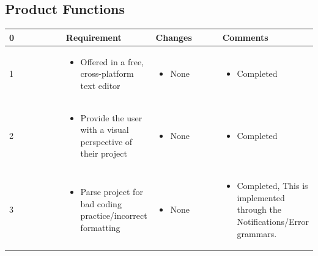 \documentclass[letterpaper,10pt,titlepage,draftclsnofoot,onecolumn,onesided] {IEEEtran}
\begin{document}
\subsection{Product Functions}
\small{
\begin{center}
	\begin{singlespace}
		\begin{tabular}{ |  p{0.25\linewidth}  |  p{0.25\linewidth}  | p{0.25\linewidth} | p{0.25\linewidth} |}
		\hline
		0 & Requirement & Changes & Comments \\ \hline
		
			1
		& 
			\begin{itemize}
				\item Offered in a free, cross-platform text editor
			\end{itemize}
		& 
			\begin{itemize}
				\item None
			\end{itemize}
		&
			\begin{itemize}
				\item Completed
			\end{itemize} 
		
        \\ \hline

			2
		& 
			\begin{itemize}
				\item Provide the user with a visual perspective of their project
			\end{itemize}
		& 
			\begin{itemize}
				\item None
			\end{itemize}
		&
			\begin{itemize}
				\item Completed
			\end{itemize} 
		
        \\ \hline

            3
		& 
			\begin{itemize}
				\item Parse project for bad coding practice/incorrect formatting
			\end{itemize}
		& 
			\begin{itemize}
				\item None
			\end{itemize}
		&
			\begin{itemize}
				\item Completed, This is implemented through the Notifications/Error grammars.
			\end{itemize} 
		

\end{tabular}
\end{singlespace}
\end{center}}
\end{document}
